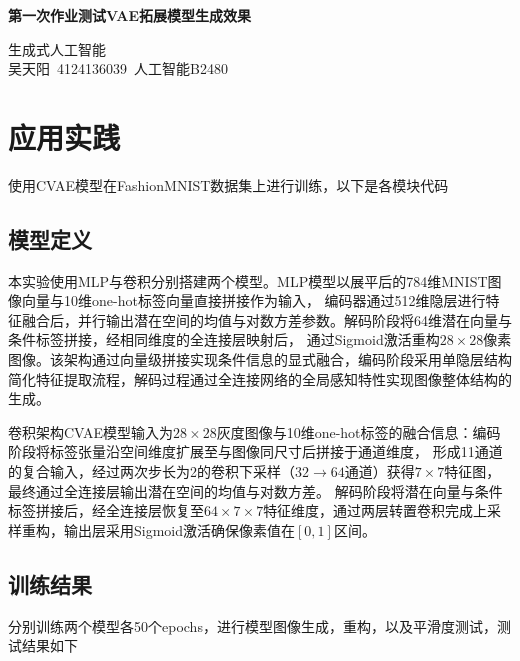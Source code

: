\documentclass[12pt, a4paper, oneside]{ctexart}
\numberwithin{equation}{section}  %
\newenvironment{myTitle}[1]{
    \begin{center}
    {\zihao{-2}\bf #1\\}
    \zihao{-4}\it
}{\end{center}}  %
\begin{document}
\begin{myTitle}{第一次作业\quad 测试VAE拓展模型生成效果}
    生成式人工智能\\ 吴天阳\ 4124136039\ 人工智能B2480
\end{myTitle}
\section{应用实践}
使用CVAE模型在FashionMNIST数据集上进行训练，以下是各模块代码

\subsection{模型定义}

本实验使用MLP与卷积分别搭建两个模型。MLP模型以展平后的784维MNIST图像向量与10维one-hot标签向量直接拼接作为输入，
编码器通过512维隐层进行特征融合后，并行输出潜在空间的均值与对数方差参数。解码阶段将64维潜在向量与条件标签拼接，经相同维度的全连接层映射后，
通过Sigmoid激活重构$28\times 28$像素图像。该架构通过向量级拼接实现条件信息的显式融合，编码阶段采用单隐层结构简化特征提取流程，解码过程通过全连接网络的全局感知特性实现图像整体结构的生成。

卷积架构CVAE模型输入为$28\times 28$灰度图像与10维one-hot标签的融合信息：编码阶段将标签张量沿空间维度扩展至与图像同尺寸后拼接于通道维度，
形成11通道的复合输入，经过两次步长为2的卷积下采样（$32\to 64$通道）获得$7\times 7$特征图，最终通过全连接层输出潜在空间的均值与对数方差。
解码阶段将潜在向量与条件标签拼接后，经全连接层恢复至$64\times 7\times 7$特征维度，通过两层转置卷积完成上采样重构，输出层采用Sigmoid激活确保像素值在$[0,1]$区间。
\subsection{训练结果}
分别训练两个模型各50个epochs，进行模型图像生成，重构，以及平滑度测试，测试结果如下
\end{document}
